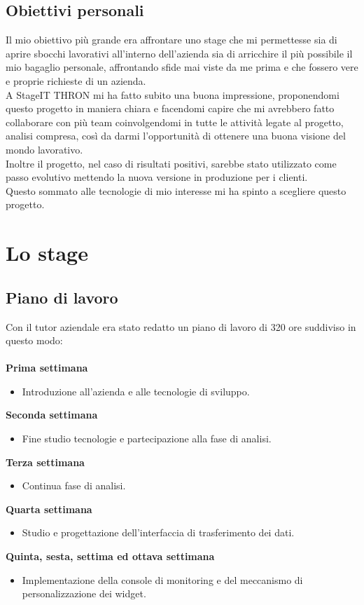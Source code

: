 \documentclass[a4paper, 12pt, twoside, openright]{book}
\begin{document}
\section{Obiettivi personali}
Il mio obiettivo più grande era affrontare uno stage che mi permettesse sia di aprire sbocchi lavorativi all'interno dell'azienda sia di arricchire il più possibile il mio bagaglio personale, affrontando sfide mai viste da me prima e che fossero vere e proprie richieste di un azienda.\\

A StageIT THRON mi ha fatto subito una buona impressione, proponendomi questo progetto in maniera chiara e facendomi capire che mi avrebbero fatto collaborare con più team coinvolgendomi in tutte le attività legate al progetto, analisi compresa, così da darmi l'opportunità di ottenere una buona visione del mondo lavorativo.\\
Inoltre il progetto, nel caso di risultati positivi, sarebbe stato utilizzato come passo evolutivo mettendo la nuova versione in produzione per i clienti.\\
Questo sommato alle tecnologie di mio interesse mi ha spinto a scegliere questo progetto.

\chapter{Lo stage}

\section{Piano di lavoro}
Con il tutor aziendale era stato redatto un piano di lavoro di 320 ore suddiviso in questo modo:\\ \\
\textbf{Prima settimana}
\begin{itemize}
\item Introduzione all'azienda e alle tecnologie di sviluppo.
\end{itemize}
\textbf{Seconda settimana}
\begin{itemize}
\item Fine studio tecnologie e partecipazione alla fase di analisi.
\end{itemize}
\textbf{Terza settimana}
\begin{itemize}
\item Continua fase di analisi.
\end{itemize}
\textbf{Quarta settimana}
\begin{itemize}
\item Studio e progettazione dell'interfaccia di trasferimento dei dati.
\end{itemize}
\textbf{Quinta, sesta, settima ed ottava settimana}
\begin{itemize}
\item Implementazione della console di monitoring e del meccanismo di personalizzazione dei widget.
\end{itemize}
\end{document}
